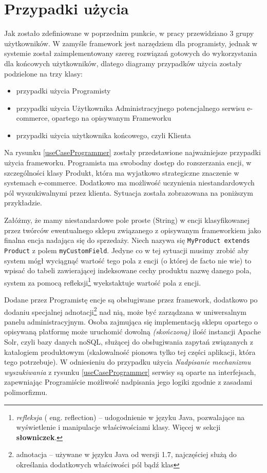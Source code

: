 \section{Przypadki użycia}
Jak zostało zdefiniowane w poprzednim punkcie, w pracy przewidziano 3 grupy użytkowników. W zamyśle framework jest narzędziem dla programisty, jednak w systemie został zaimplementowany szereg rozwiązań gotowych do wykorzystania dla końcowych użytkowników, dlatego diagramy przypadków użycia zostały podzielone na trzy klasy: 
\begin{itemize}
	\item przypadki użycia Programisty 
	\item przypadki użycia Użytkownika Administracyjnego potencjalnego serwisu e-commerce, opartego na opisywanym Frameworku
	\item przypadki użycia użytkownika końcowego, czyli Klienta
\end{itemize}
Na rysunku \ref{useCaseProgrammer} zostały przedstawione najważniejsze przypadki użycia frameworku. Programista ma swobodny dostęp do rozszerzania encji, w szczególności klasy Produkt, która ma wyjatkowo strategiczne znaczenie w systemach e-commerce. Dodatkowo ma możliwość uczynienia niestandardowych pól wyszukiwalnymi przez klienta. Sytuacja została zobrazowana na poniższym przykładzie.
\begin{example}
	Załóżmy, że mamy niestandardowe pole proste (String) w encji klasyfikowanej przez twórców ewentualnego sklepu związanego z opisywanym frameworkiem jako finalna encja nadająca się do sprzedaży. Niech nazywa się \texttt{MyProduct extends Product} z polem \texttt{myCustomField}. Jedyne co w tej sytuacji musimy zrobić aby system mógł wyciągnąć wartość tego pola z encji (o której de facto nie wie) to wpisać do tabeli zawierającej indeksowane cechy produktu nazwę danego pola, system za pomocą refleksji\footnote{\textit{refleksja} ( eng. reflection) -- udogodnienie w języku Java, pozwalające na wyświetlenie i manipulacje właściwościami klasy. Więcej w sekcji \textbf{słowniczek}.} wyekstaktuje wartość pola z encji.    


Dodane przez Programistę encje są obsługiwane przez framework, dodatkowo po dodaniu specjalnej adnotacji\footnote{adnotacja -- używane w języku Java od wersji 1.7, najczęściej służą do określania dodatkowych właściwości pól bądź klas} nad nią, może być zarządzana w uniwersalnym panelu administracyjnym. Osoba zajmująca się implementacją sklepu opartego o opisywaną platformę może uruchomić dowolną \textit{(skończoną)} ilość instancji Apache Solr, czyli bazy danych noSQL, służącej do obsługiwania zapytań związanych z katalogiem produktowym (skalowalność pionowa tylko tej części aplikacji, która tego potrzebuje). W odniesieniu do przypadku użycia \textit{Nadpisanie mechanizmu wyszukiwania} z rysunku \ref{useCaseProgrammer} serwisy są oparte na interfejsach, zapewniając Programiście możliwość nadpisania jego logiki zgodnie z zasadami polimorfizmu. 
\end{example}
